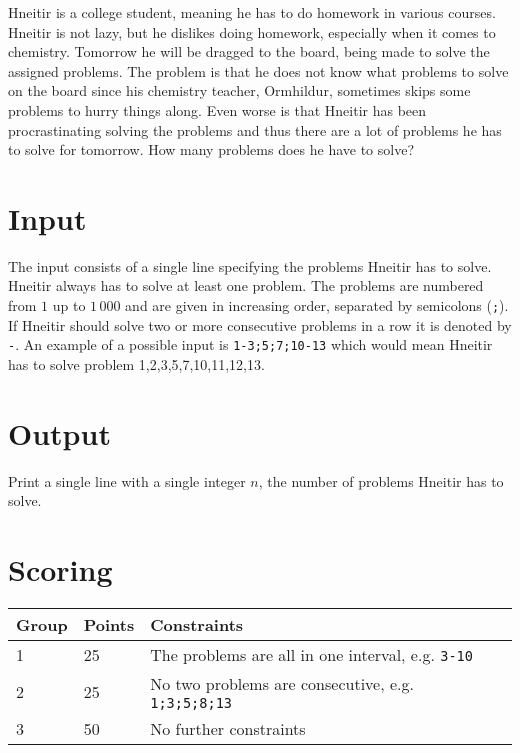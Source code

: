 
\noindent
Hneitir is a college student, meaning he has to do homework in various courses.
Hneitir is not lazy, but he dislikes doing homework, especially when it comes to chemistry.
Tomorrow he will be dragged to the board, being made to solve the assigned problems.
The problem is that he does not know what problems to solve on the board
since his chemistry teacher, Ormhildur, sometimes skips some problems to hurry things along.
Even worse is that Hneitir has been procrastinating solving the problems
and thus there are a lot of problems he has to solve for tomorrow.
How many problems does he have to solve?

\section*{Input}
The input consists of a single line specifying the problems Hneitir has to solve.
Hneitir always has to solve at least one problem.
The problems are numbered from $1$ up to $1\,000$
and are given in increasing order, separated by semicolons (\texttt{;}).
If Hneitir should solve two or more consecutive problems in a row
it is denoted by \texttt{-}.
An example of a possible input is \texttt{1-3;5;7;10-13}
which would mean Hneitir has to solve problem 1,2,3,5,7,10,11,12,13.

\section*{Output}
Print a single line with a single integer $n$, the number of problems Hneitir has to solve.

\section*{Scoring}
\begin{tabular}{|l|l|l|l|}
\hline
Group & Points & Constraints \\ \hline
1     & 25  & The problems are all in one interval, e.g. \texttt{3-10} \\ \hline
2     & 25  & No two problems are consecutive, e.g. \texttt{1;3;5;8;13} \\ \hline
3     & 50  & No further constraints \\ \hline
\end{tabular}
